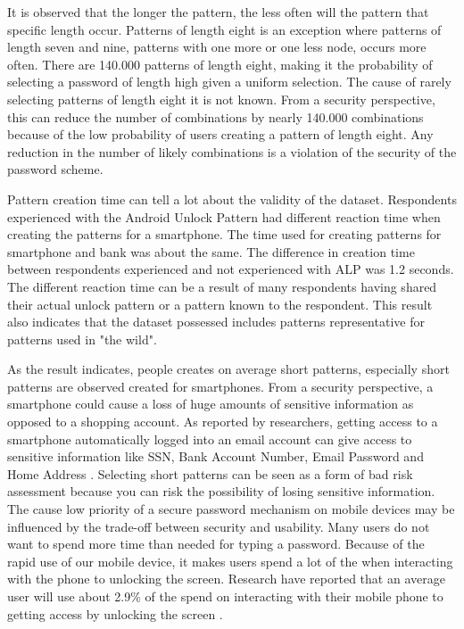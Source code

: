       It is observed that the longer the pattern, the less often will the pattern that specific length occur. Patterns of length eight is an exception where patterns of length seven and nine, patterns with one more or one less node, occurs more often. There are 140.000 patterns of length eight, making it the probability of selecting a password of length high given a uniform selection. The cause of rarely selecting patterns of length eight it is not known. From a security perspective, this can reduce the number of combinations by nearly 140.000 combinations because of the low probability of users creating a pattern of length eight. Any reduction in the number of likely combinations is a violation of the security of the password scheme.

      Pattern creation time can tell a lot about the validity of the dataset. Respondents experienced with the Android Unlock Pattern had different reaction time when creating the patterns for a smartphone. The time used for creating patterns for smartphone and bank was about the same. The difference in creation time between respondents experienced and not experienced with ALP was 1.2 seconds. The different reaction time can be a result of many respondents having shared their actual unlock pattern or a pattern known to the respondent. This result also indicates that the dataset possessed includes patterns representative for patterns used in "the wild". 

      As the result indicates, people creates on average short patterns, especially short patterns are observed created for smartphones. From a security perspective, a smartphone could cause a loss of huge amounts of sensitive information as opposed to a shopping account. As reported by researchers, getting access to a smartphone automatically logged into an email account can give access to sensitive information like SSN, Bank Account Number, Email Password and Home Address \cite{Egelman}. Selecting short patterns can be seen as a form of bad risk assessment because you can risk the possibility of losing sensitive information. The cause low priority of a secure password mechanism on mobile devices may be influenced by the trade-off between security and usability. Many users do not want to spend more time than needed for typing a password. Because of the rapid use of our mobile device, it makes users spend a lot of the when interacting with the phone to unlocking the screen. Research have reported that an average user will use about 2.9\% of the spend on interacting with their mobile phone to getting access by unlocking the screen \cite{habits3}.

